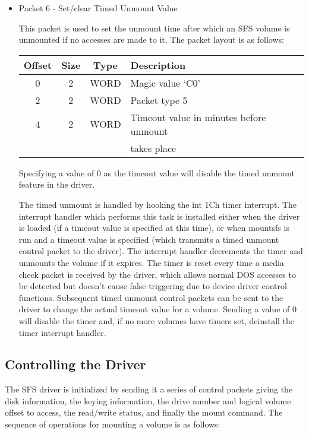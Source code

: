 \begin{itemize}
\item Packet 6 - Set/clear Timed Unmount Value

This packet is used to set the unmount time after which an SFS volume is
unmounted if no accesses are made to it.  The packet layout is as follows:

\begin{center}
\begin{tabular}{|c|c|c|l|}
\hline
    Offset & Size  &  Type    &    Description\\
\hline
       0   &   2   &  WORD    &    Magic value `C0'\\
       2   &   2   &  WORD    &    Packet type 5\\
       4   &   2   &  WORD    &    Timeout value in minutes before unmount\\
           &       &          &    takes place\\
\hline
\end{tabular}
\end{center}

Specifying a value of 0 as the timeout value will disable the timed unmount
feature in the driver.

The timed unmount is handled by hooking the int 1Ch timer interrupt.  The
interrupt handler which performs this task is installed either when the driver
is loaded (if a timeout value is specified at this time), or when mountsfs is
run and a timeout value is specified (which transmits a timed unmount control
packet to the driver).  The interrupt handler decrements the timer and unmounts
the volume if it expires.  The timer is reset every time a media check packet
is received by the driver, which allows normal DOS accesses to be detected but
doesn't cause false triggering due to device driver control functions.
Subsequent timed unmount control packets can be sent to the driver to change
the actual timeout value for a volume.  Sending a value of 0 will disable the 
timer and, if no more volumes have timers set, deinstall the timer interrupt 
handler.

\end{itemize}

\subsection{Controlling the Driver}

The SFS driver is initialized by sending it a series of control packets giving
the disk information, the keying information, the drive number and logical
volume offset to access, the read/write status, and finally the mount command.
The sequence of operations for mounting a volume is as follows:

